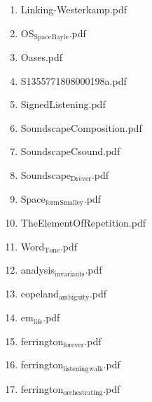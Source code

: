 \documentclass[11pt]{article}
\begin{document}
\begin{enumerate}
\begin{enumerate}
\begin{enumerate}
\item Linking-Westerkamp.pdf
\label{sec-1-1-1-1-11-19-20-20-2-20}

\item OS$_{\text{Space}}$$_{\text{Bayle}}$.pdf
\label{sec-1-1-1-1-11-19-20-20-2-21}

\item Oases.pdf
\label{sec-1-1-1-1-11-19-20-20-2-22}

\item S1355771808000198a.pdf
\label{sec-1-1-1-1-11-19-20-20-2-23}

\item SignedListening.pdf
\label{sec-1-1-1-1-11-19-20-20-2-24}

\item SoundscapeComposition.pdf
\label{sec-1-1-1-1-11-19-20-20-2-25}

\item SoundscapeCsound.pdf
\label{sec-1-1-1-1-11-19-20-20-2-26}

\item Soundscape$_{\text{Drever}}$.pdf
\label{sec-1-1-1-1-11-19-20-20-2-27}

\item Space$_{\text{form}}$$_{\text{Smalley}}$.pdf
\label{sec-1-1-1-1-11-19-20-20-2-28}

\item TheElementOfRepetition.pdf
\label{sec-1-1-1-1-11-19-20-20-2-29}

\item Word$_{\text{Tone}}$.pdf
\label{sec-1-1-1-1-11-19-20-20-2-30}

\item analysis$_{\text{invariants}}$.pdf
\label{sec-1-1-1-1-11-19-20-20-2-31}

\item copeland$_{\text{ambiguity}}$.pdf
\label{sec-1-1-1-1-11-19-20-20-2-32}

\item em$_{\text{life}}$.pdf
\label{sec-1-1-1-1-11-19-20-20-2-33}

\item ferrington$_{\text{forever}}$.pdf
\label{sec-1-1-1-1-11-19-20-20-2-34}

\item ferrington$_{\text{listening}}$$_{\text{walk}}$.pdf
\label{sec-1-1-1-1-11-19-20-20-2-35}

\item ferrington$_{\text{orchestrating}}$.pdf
\label{sec-1-1-1-1-11-19-20-20-2-36}


\end{enumerate}
\end{enumerate}
\end{enumerate}
\end{document}
